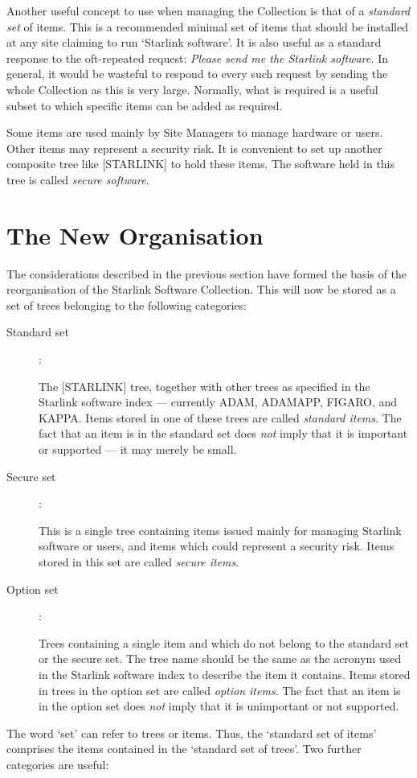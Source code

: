 Another useful concept to use when managing the Collection is that of a
{\em standard set} of items.
This is a recommended minimal set of items that should be installed at any
site claiming to run `Starlink software'.
It is also useful as a standard response to the oft-repeated request: {\em
Please send me the Starlink software.}
In general, it would be wasteful to respond to every such request by sending
the whole Collection as this is very large.
Normally, what is required is a useful subset to which specific items can be
added as required.

Some items are used mainly by Site Managers to manage hardware or users.
Other items may represent a security risk.
It is convenient to set up another composite tree like [STARLINK] to hold these
items.
The software held in this tree is called {\em secure software}.

\section{The New Organisation}

The considerations described in the previous section have formed the basis
of the reorganisation of the Starlink Software Collection.
This will now be stored as a set of trees belonging to the following categories:
\begin{description}
\begin{description}
\item [Standard set] :

 The [STARLINK] tree, together with other trees as specified in the Starlink
 software index --- currently ADAM, ADAMAPP, FIGARO, and KAPPA.
 Items stored in one of these trees are called {\em standard items}.
 The fact that an item is in the standard set does {\em not} imply that it is
 important or supported --- it may merely be small.

\item [Secure set] :

 This is a single tree containing items issued mainly for managing Starlink
 software or users, and items which could represent a security risk.
 Items stored in this set are called {\em secure items}.

\item [Option set] :

 Trees containing a single item and which do not belong to the standard set or
 the secure set.
 The tree name should be the same as the acronym used in the Starlink software
 index to describe the item it contains.
 Items stored in trees in the option set are called {\em option items}.
 The fact that an item is in the option set does {\em not} imply that it is
 unimportant or not supported.
 
\end{description}
\end{description}
The word `set' can refer to trees or items.
Thus, the `standard set of items' comprises the items contained in the `standard
set of trees'.
Two further categories are useful:


